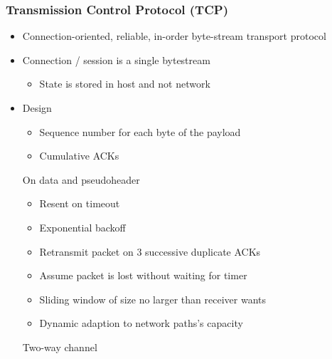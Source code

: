 \subsubsection{Transmission Control Protocol (TCP)}
\begin{itemize}
    \item Connection-oriented, reliable, in-order byte-stream transport protocol
    \item Connection / session is a single bytestream
        \begin{itemize}
            \item State is stored in host and not network
        \end{itemize}
    \item Design
        \begin{itemize}
                \begin{itemize}
                    \item Sequence number for each byte of the payload
                    \item Cumulative ACKs
                \end{itemize}
             On data and pseudoheader
                \begin{itemize}
                    \item Resent on timeout
                    \item Exponential backoff
                \end{itemize}
                \begin{itemize}
                    \item Retransmit packet on $3$ successive duplicate ACKs
                    \item Assume packet is lost without waiting for timer
                \end{itemize}
                \begin{itemize}
                    \item Sliding window of size no larger than receiver wants
                \end{itemize}
                \begin{itemize}
                    \item Dynamic adaption to network paths's capacity
                \end{itemize}
        \end{itemize}
     Two-way channel
\end{itemize}


